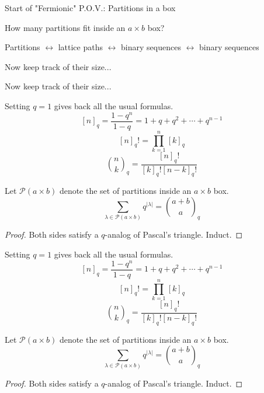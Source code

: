 \documentclass{beamer}
\newcommand{\PP}{\mathcal{P}} %
\begin{document}
\begin{frame}{Start of "Fermionic" P.O.V.: Partitions in a box}
\begin{block}{How many partitions fit inside an $a\times b$ box?}

Partitions $\leftrightarrow$ lattice paths $\leftrightarrow$ binary sequences $\leftrightarrow$ binary sequences
\end{block}

\begin{block}{Now keep track of their size...}
\end{block}

\begin{block}{Now keep track of their size...}
\end{block}
\end{frame}{Setting $q=1$ gives back all the usual formulas.} 
$$[n]_q=\frac{1-q^n}{1-q}=1+q+q^2+\cdots + q^{n-1}$$ $$[n]_q!=\prod_{k=1}^n [k]_q$$
$$\binom{n}{k}_q=\frac{[n]_q!}{[k]_q![n-k]_q!}$$


\begin{theorem}[Exercise!]
Let $\mathcal{P}(a\times b)$ denote the set of partitions inside an $a\times b$ box.  
$$\sum_{\lambda\in\PP(a\times b)}q^{|\lambda|}=\binom{a+b}{a}_q$$
\end{theorem}
\begin{proof}Both sides satisfy a $q$-analog of Pascal's triangle. Induct.\end{proof} \begin{frame}{Setting $q=1$ gives back all the usual formulas.} 
$$[n]_q=\frac{1-q^n}{1-q}=1+q+q^2+\cdots + q^{n-1}$$ $$[n]_q!=\prod_{k=1}^n [k]_q$$
$$\binom{n}{k}_q=\frac{[n]_q!}{[k]_q![n-k]_q!}$$


\begin{theorem}[Exercise!]
Let $\mathcal{P}(a\times b)$ denote the set of partitions inside an $a\times b$ box.  
$$\sum_{\lambda\in\PP(a\times b)}q^{|\lambda|}=\binom{a+b}{a}_q$$
\end{theorem}
\begin{proof}Both sides satisfy a $q$-analog of Pascal's triangle. Induct.\end{proof} 
\end{frame}
\end{document}
